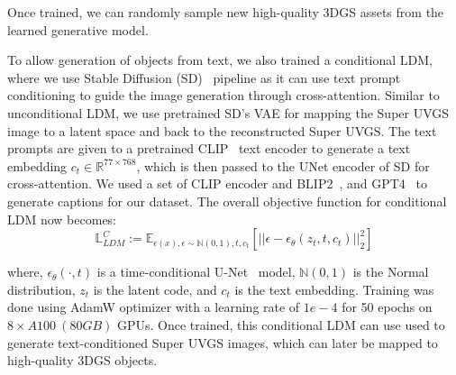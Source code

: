 Once trained, we can randomly sample new high-quality 3DGS assets from the learned generative model.


To allow generation of objects from text, we also trained a conditional LDM, where we use Stable Diffusion (SD)~\cite{stable_diffusion} pipeline as it can use text prompt conditioning to guide the image generation through cross-attention. Similar to unconditional LDM, we use pretrained SD's VAE for mapping the Super UVGS image to a latent space and back to the reconstructed Super UVGS.
The text prompts are given to a pretrained CLIP~\cite{clip} text encoder to generate a text embedding $c_t \in \mathbb{R}^{77 \times 768} $, which is then passed to the UNet encoder of SD for cross-attention. We used a set of CLIP encoder and BLIP2~\cite{blip22023}, and GPT4~\cite{gpt42023} to generate captions for our dataset. 
The overall objective function for conditional LDM now becomes:
%
\begin{equation}
    \mathbb{L}^C_{LDM} := \mathbb{E}_{\epsilon(x),\epsilon \sim \mathbb{N}(0,1), t, c_t } [ || \epsilon - \epsilon_\theta ( z_t, t, c_t ) ||_2^2 ]
\end{equation}

where, $\epsilon_\theta (\cdot, t)$ is a time-conditional U-Net~\cite{unet} model, $\mathbb{N}(0,1)$ is the Normal distribution, $z_t$ is the latent code, and $c_t$ is the text embedding.
Training was done using AdamW optimizer with a learning rate of $1e-4$ for 50 epochs on $8 \times A100 ~(80GB)$ GPUs.
Once trained, this conditional LDM can use used to generate text-conditioned Super UVGS images, which can later be mapped to high-quality 3DGS objects. 










